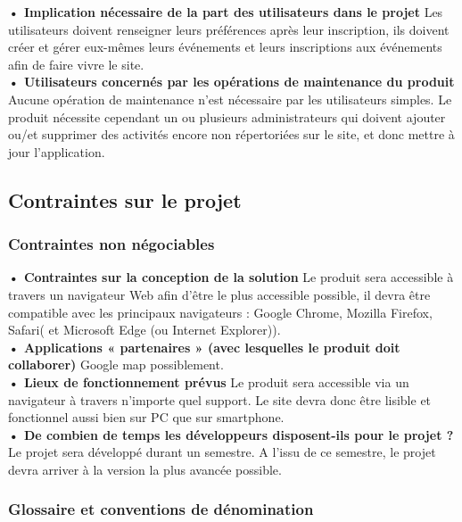 \textbf{• Implication nécessaire de la part des utilisateurs dans le projet}
Les utilisateurs doivent renseigner leurs préférences après leur inscription, ils doivent créer et gérer eux-mêmes leurs événements et leurs inscriptions aux événements afin de faire vivre le site. \\

\textbf{• Utilisateurs concernés par les opérations de maintenance du produit}
Aucune opération de maintenance n’est nécessaire par les utilisateurs simples. Le produit nécessite cependant un ou plusieurs administrateurs qui doivent ajouter ou/et supprimer des activités encore non répertoriées sur le site, et donc mettre à jour l’application.

\subsection{Contraintes sur le projet}

\subsubsection{Contraintes non négociables}

\textbf{• Contraintes sur la conception de la solution}
Le produit sera accessible à travers un navigateur Web afin d’être le plus accessible possible, il devra être compatible avec les principaux navigateurs : Google Chrome, Mozilla Firefox, Safari( et Microsoft Edge (ou Internet Explorer)). \\

\textbf{• Applications « partenaires » (avec lesquelles le produit doit collaborer)}
Google map possiblement. \\

\textbf{• Lieux de fonctionnement prévus}
Le produit sera accessible via un navigateur à travers n’importe quel support. Le site devra donc être lisible et fonctionnel aussi bien sur PC que sur smartphone. \\

\textbf{• De combien de temps les développeurs disposent-ils pour le projet ?}
Le projet sera développé durant un semestre. A l’issu de ce semestre, le projet devra arriver à la version la plus avancée possible.

\subsubsection{Glossaire et conventions de dénomination}

